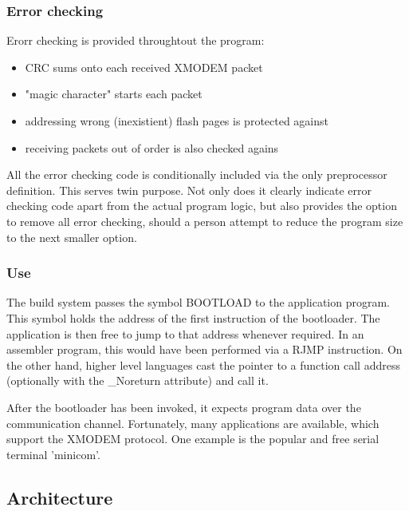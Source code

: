 \subsubsection{Error checking}
Erorr checking is provided throughtout the program:
\begin{itemize}
\item{CRC sums onto each received XMODEM packet}
\item{"magic character" starts each packet}
\item{addressing wrong (inexistient) flash pages is protected against}
\item{receiving packets out of order is also checked agains}
\end{itemize}
All the error checking code is conditionally included via the only preprocessor definition.
This serves twin purpose.
Not only does it clearly indicate error checking code apart from the actual program logic, but also provides the option to remove all error checking, should a person attempt to reduce the program size to the next smaller option.

\subsubsection{Use}
The build system passes the symbol BOOTLOAD to the application program.
This symbol holds the address of the first instruction of the bootloader.
The application is then free to jump to that address whenever required.
In an assembler program, this would have been performed via a RJMP instruction.
On the other hand, higher level languages cast the pointer to a function call address (optionally with the \_Noreturn attribute) and call it.
\par
After the bootloader has been invoked, it expects program data over the communication channel.
Fortunately, many applications are available, which support the XMODEM protocol.
One example is the popular and free serial terminal 'minicom'.

\subsection{Architecture}
